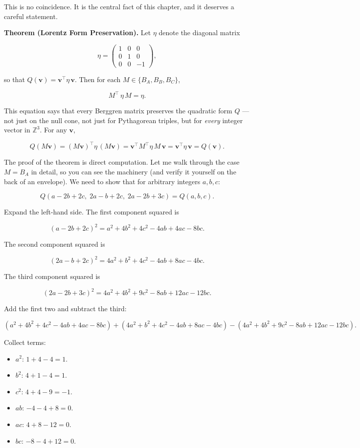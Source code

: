 This is no coincidence. It is the central fact of this chapter, and it deserves a careful statement.

\textbf{Theorem (Lorentz Form Preservation).} Let $\eta$ denote the diagonal matrix

\[
\eta = \begin{pmatrix} 1 & 0 & 0 \\ 0 & 1 & 0 \\ 0 & 0 & -1 \end{pmatrix},
\]

so that $Q(\mathbf{v}) = \mathbf{v}^\top \eta\, \mathbf{v}$. Then for each $M \in \{B_A, B_B, B_C\}$,

\[
M^{\!\top}\, \eta\, M = \eta.
\]

This equation says that every Berggren matrix preserves the quadratic form $Q$ --- not just on the null cone, not just for Pythagorean triples, but for \textit{every} integer vector in $\mathbb{Z}^3$. For any $\mathbf{v}$,

\[
Q(M\mathbf{v}) = (M\mathbf{v})^\top \eta\, (M\mathbf{v}) = \mathbf{v}^\top M^\top \eta\, M\, \mathbf{v} = \mathbf{v}^\top \eta\, \mathbf{v} = Q(\mathbf{v}).
\]

The proof of the theorem is direct computation. Let me walk through the case $M = B_A$ in detail, so you can see the machinery (and verify it yourself on the back of an envelope). We need to show that for arbitrary integers $a, b, c$:

\[
Q(a - 2b + 2c,\; 2a - b + 2c,\; 2a - 2b + 3c) = Q(a, b, c).
\]

Expand the left-hand side. The first component squared is

\[
(a - 2b + 2c)^2 = a^2 + 4b^2 + 4c^2 - 4ab + 4ac - 8bc.
\]

The second component squared is

\[
(2a - b + 2c)^2 = 4a^2 + b^2 + 4c^2 - 4ab + 8ac - 4bc.
\]

The third component squared is

\[
(2a - 2b + 3c)^2 = 4a^2 + 4b^2 + 9c^2 - 8ab + 12ac - 12bc.
\]

Add the first two and subtract the third:

\[
(a^2 + 4b^2 + 4c^2 - 4ab + 4ac - 8bc) + (4a^2 + b^2 + 4c^2 - 4ab + 8ac - 4bc) - (4a^2 + 4b^2 + 9c^2 - 8ab + 12ac - 12bc).
\]

Collect terms:
\begin{itemize}[leftmargin=*]
\item $a^2$: $1 + 4 - 4 = 1$.
\item $b^2$: $4 + 1 - 4 = 1$.
\item $c^2$: $4 + 4 - 9 = -1$.
\item $ab$: $-4 - 4 + 8 = 0$.
\item $ac$: $4 + 8 - 12 = 0$.
\item $bc$: $-8 - 4 + 12 = 0$.
\end{itemize}

